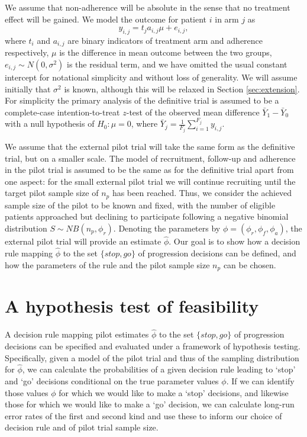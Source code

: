 \documentclass[AMA,STIX1COL]{WileyNJD-v2}
\begin{document}
We assume that non-adherence will be absolute in the sense that no treatment effect will be gained. We model the outcome for patient $i$ in arm $j$ as
$$
y_{i,j} = t_j a_{i,j} \mu + e_{i,j},
$$
where $t_i$ and $a_{i,j}$ are binary indicators of treatment arm and adherence respectively, $\mu$ is the difference in mean outcome between the two groups, $e_{i,j} \sim N(0, \sigma^2)$ is the residual term, and we have omitted the usual constant intercept for notational simplicity and without loss of generality. We will assume initially that $\sigma^2$ is known, although this will be relaxed in Section \ref{sec:extension}. For simplicity the primary analysis of the definitive trial is assumed to be a complete-case intention-to-treat $z$-test of the observed mean difference $\bar{Y}_1 - \bar{Y}_0$ with a null hypothesis of $H_0: \mu = 0$, where $\bar{Y}_j = \frac{1}{F_j} \sum_{i=1}^{F_j} y_{i,j}$.

We assume that the external pilot trial will take the same form as the definitive trial, but on a smaller scale. The model of recruitment, follow-up and adherence in the pilot trial is assumed to be the same as for the definitive trial apart from one aspect: for the small external pilot trial we will continue recruiting until the target pilot sample size of $n_p$ has been reached. Thus, we consider the achieved sample size of the pilot to be known and fixed, with the number of eligible patients approached but declining to participate following a negative binomial distribution $S \sim NB(n_p, \phi_r)$. Denoting the parameters by $\phi = (\phi_r, \phi_f, \phi_a)$, the external pilot trial will provide an estimate $\hat{\phi}$. Our goal is to show how a decision rule mapping $\hat{\phi}$ to the set $\{stop, go\}$ of progression decisions can be defined, and how the parameters of the rule and the pilot sample size $n_p$ can be chosen.

\section{A hypothesis test of feasibility}\label{sec:methods}

A decision rule mapping pilot estimates $\hat{\phi}$ to the set $\{stop, go\}$ of progression decisions can be specified and evaluated under a framework of hypothesis testing. Specifically, given a model of the pilot trial and thus of the sampling distribution for $\hat{\phi}$, we can calculate the probabilities of a given decision rule leading to `stop' and `go' decisions conditional on the true parameter values $\phi$. If we can identify those values $\phi$ for which we would like to make a `stop' decisions, and likewise those for which we would like to make a `go' decision, we can calculate long-run error rates of the first and second kind and use these to inform our choice of decision rule and of pilot trial sample size.
\end{document}
